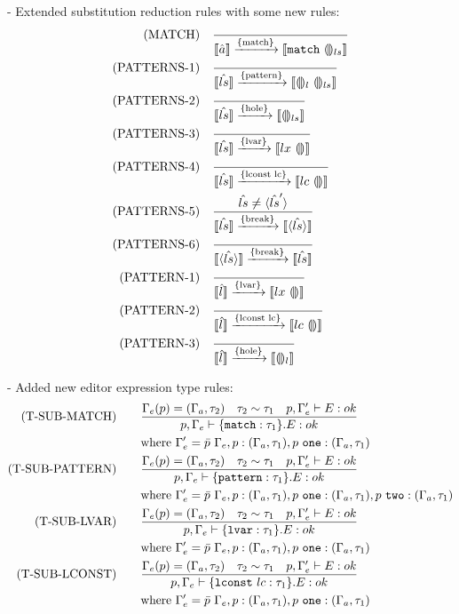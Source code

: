 \documentclass[10pt,a4paper,english]{article}
\newcommand\match[1]{\texttt{match}~#1}
\begin{document}
- Extended substitution reduction rules with some new rules:
\begin{align}
  (\text{MATCH})\quad& \frac{}{\cursor{\hat{a}}\transition{\{match\}}\cursor{\match{\hole_{ls}}}}\\
  (\text{PATTERNS-1})\quad& \frac{}{\cursor{\hat{ls}}\transition{\{pattern\}}\cursor{\hole_l~\hole_{ls}}}\\
  (\text{PATTERNS-2})\quad& \frac{}{\cursor{\hat{ls}}\transition{\{hole\}}\cursor{\hole_{ls}}}\\
  (\text{PATTERNS-3})\quad& \frac{}{\cursor{\hat{ls}}\transition{\{lvar\}}\cursor{lx~\hole}}\\
  (\text{PATTERNS-4})\quad& \frac{}{\cursor{\hat{ls}}\transition{\{lconst~lc\}}\cursor{lc~\hole}}\\
  (\text{PATTERNS-5})\quad& \frac{\hat{ls}\neq\breakpoint{\hat{ls}'}}{\cursor{\hat{ls}}\transition{\{break\}}\cursor{\breakpoint{\hat{ls}}}}\\
  (\text{PATTERNS-6})\quad& \frac{}{\cursor{\breakpoint{\hat{ls}}}\transition{\{break\}}\cursor{\hat{ls}}}\\
  (\text{PATTERN-1})\quad& \frac{}{\cursor{\hat{l}}\transition{\{lvar\}}\cursor{lx~\hole}}\\
  (\text{PATTERN-2})\quad& \frac{}{\cursor{\hat{l}}\transition{\{lconst~lc\}}\cursor{lc~\hole}}\\
  (\text{PATTERN-3})\quad& \frac{}{\cursor{\hat{l}}\transition{\{hole\}}\cursor{\hole_{l}}}
\end{align}



- Added new editor expression type rules:
\begin{align}
  (\text{T-SUB-MATCH})\qquad&\frac{\Gamma_{e}(p) = (\Gamma_{a},\tau_2) \quad \tau_2\sim\tau_1 \quad p,\Gamma_{e}' \vdash E : ok}{p,\Gamma_{e} \vdash \{\texttt{match} : \tau_1\}.E : ok}\\
&\text{where}~\Gamma_{e}' = \bar{p}~\Gamma_{e}, p : (\Gamma_{a}, \tau_1), p~\texttt{one} : (\Gamma_{a}, \tau_1)\\
  (\text{T-SUB-PATTERN})\qquad&\frac{\Gamma_{e}(p) = (\Gamma_{a},\tau_2) \quad \tau_2\sim\tau_1 \quad p,\Gamma_{e}' \vdash E : ok}{p,\Gamma_{e} \vdash \{\texttt{pattern} : \tau_1\}.E : ok}\\
&\text{where}~\Gamma_{e}' = \bar{p}~\Gamma_{e}, p : (\Gamma_{a}, \tau_1), p~\texttt{one} : (\Gamma_{a}, \tau_1), p~\texttt{two} : (\Gamma_{a}, \tau_1)\\
  (\text{T-SUB-LVAR})\qquad&\frac{\Gamma_{e}(p) = (\Gamma_{a},\tau_2) \quad \tau_2\sim\tau_1 \quad p,\Gamma_{e}' \vdash E : ok}{p,\Gamma_{e} \vdash \{\texttt{lvar} : \tau_1\}.E : ok}\\
&\text{where}~\Gamma_{e}' = \bar{p}~\Gamma_{e}, p : (\Gamma_{a}, \tau_1), p~\texttt{one} : (\Gamma_{a}, \tau_1)\\
  (\text{T-SUB-LCONST})\qquad&\frac{\Gamma_{e}(p) = (\Gamma_{a},\tau_2) \quad \tau_2\sim\tau_1 \quad p,\Gamma_{e}' \vdash E : ok}{p,\Gamma_{e} \vdash \{\texttt{lconst}~lc : \tau_1\}.E : ok}\\
&\text{where}~\Gamma_{e}' = \bar{p}~\Gamma_{e}, p : (\Gamma_{a}, \tau_1), p~\texttt{one} : (\Gamma_{a}, \tau_1)
\end{align}
\end{document}
